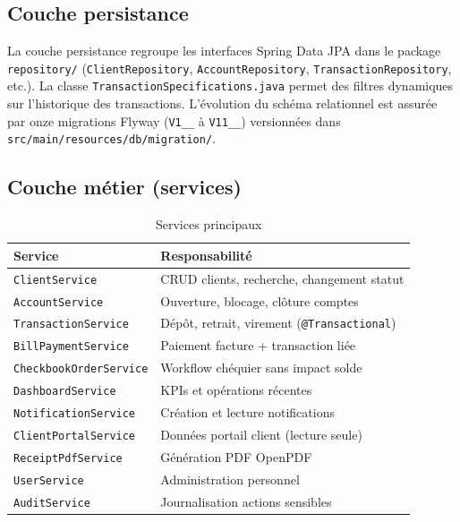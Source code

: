 \documentclass[11pt,a4paper,oneside]{report}
\begin{document}
\subsection{Couche persistance}

La couche persistance regroupe les interfaces Spring Data JPA dans le package \texttt{repository/} (\texttt{ClientRepository}, \texttt{AccountRepository}, \texttt{TransactionRepository}, etc.). La classe \texttt{TransactionSpecifications.java} permet des filtres dynamiques sur l'historique des transactions. L'évolution du schéma relationnel est assurée par onze migrations Flyway (\texttt{V1\_\_} à \texttt{V11\_\_}) versionnées dans \texttt{src/main/resources/db/migration/}.

\subsection{Couche métier (services)}

\begin{table}[H]
    \centering
    \caption{Services principaux}
    \label{tab:services}
    \small
    \begin{tabular}{@{}lp{9cm}@{}}
        \rowcolor{AmanaBrown}
        \color{white}\textbf{Service} & \textbf{Responsabilité} \\
        \midrule
        \texttt{ClientService} & CRUD clients, recherche, changement statut \\
        \texttt{AccountService} & Ouverture, blocage, clôture comptes \\
        \texttt{TransactionService} & Dépôt, retrait, virement (\texttt{@Transactional}) \\
        \texttt{BillPaymentService} & Paiement facture + transaction liée \\
        \texttt{CheckbookOrderService} & Workflow chéquier sans impact solde \\
        \texttt{DashboardService} & KPIs et opérations récentes \\
        \texttt{NotificationService} & Création et lecture notifications \\
        \texttt{ClientPortalService} & Données portail client (lecture seule) \\
        \texttt{ReceiptPdfService} & Génération PDF OpenPDF \\
        \texttt{UserService} & Administration personnel \\
        \texttt{AuditService} & Journalisation actions sensibles \\
        \bottomrule
    \end{tabular}
\end{table}
\end{document}
